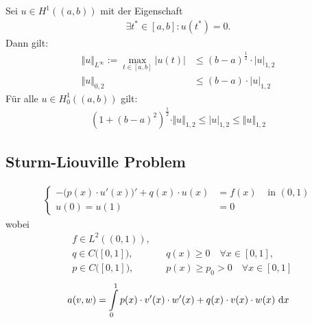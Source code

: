 \begin{lemma}\label{lemma4.3}
Sei $u\in H^1((a,b))$ mit der Eigenschaft
\begin{align*}
\exists t^\ast\in[a,b]:u(t^\ast)=0.
\end{align*}
Dann gilt:
\begin{align*}
\Vert  u\Vert_{L^\infty}:=\max\limits_{t\in [a,b]}\big|u(t)\big|&\leq(b-a)^{\frac{1}{2}}\cdot |u|_{1,2}\\
\Vert u\Vert_{0,2}&\leq(b-a)\cdot|u|_{1,2}
\end{align*}
Für alle $u\in H^1_0((a,b))$ gilt:
\begin{align*}
\left(1+(b-a)^2\right)^{\frac{1}{2}}\cdot\Vert u\Vert_{1,2}\leq|u|_{1,2}\leq\Vert u\Vert_{1,2}
\end{align*}
\end{lemma}

\subsection*{Sturm-Liouville Problem}
\begin{align}\label{eqSturmLiouvillePDE}\tag{SturmLiouville}
	\left\lbrace\begin{array}{rll}
		-\big(p(x)\cdot u'(x)\big)'+q(x)\cdot u(x) &= f(x) &\text{ in } (0,1)\\
		u(0)=u(1)&=0 &
\end{array}
\right.
\end{align}
wobei
\begin{align*}
	&f\in L^2((0,1)),\\
	&q\in C\big([0,1]\big), &&q(x)\geq0\quad\forall x\in[0,1], \\
	&p\in C\big([0,1]\big), &&p(x)\geq p_0>0\quad\forall x\in [0,1]
\end{align*}
\begin{align*}
a(v,w)=\int\limits_0^1 p(x)\cdot v'(x)\cdot w'(x)+q(x)\cdot v(x)\cdot w(x)\text{ d} x
\end{align*}

